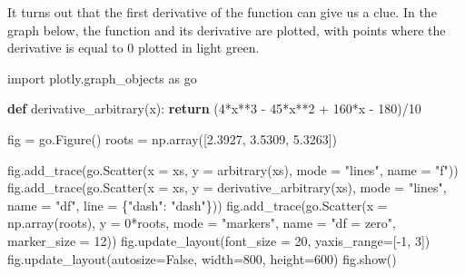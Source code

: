 \documentclass[
  letterpaper,
  DIV=11,
  numbers=noendperiod]{scrreprt}
\newenvironment{Shaded}{\begin{snugshade}}{\end{snugshade}}
\newcommand{\ControlFlowTok}[1]{\textcolor[rgb]{0.00,0.23,0.31}{\textbf{#1}}}
\newcommand{\DecValTok}[1]{\textcolor[rgb]{0.68,0.00,0.00}{#1}}
\newcommand{\FloatTok}[1]{\textcolor[rgb]{0.68,0.00,0.00}{#1}}
\newcommand{\ImportTok}[1]{\textcolor[rgb]{0.00,0.46,0.62}{#1}}
\newcommand{\KeywordTok}[1]{\textcolor[rgb]{0.00,0.23,0.31}{\textbf{#1}}}
\newcommand{\NormalTok}[1]{\textcolor[rgb]{0.00,0.23,0.31}{#1}}
\newcommand{\OperatorTok}[1]{\textcolor[rgb]{0.37,0.37,0.37}{#1}}
\newcommand{\StringTok}[1]{\textcolor[rgb]{0.13,0.47,0.30}{#1}}
\newcommand{\VariableTok}[1]{\textcolor[rgb]{0.07,0.07,0.07}{#1}}
\begin{document}
It turns out that the first derivative of the function can give us a
clue. In the graph below, the function and its derivative are plotted,
with points where the derivative is equal to 0 plotted in light green.

\begin{Shaded}
\begin{Highlighting}[]
\ImportTok{import}\NormalTok{ plotly.graph\_objects }\ImportTok{as}\NormalTok{ go}

\KeywordTok{def}\NormalTok{ derivative\_arbitrary(x):}
    \ControlFlowTok{return}\NormalTok{ (}\DecValTok{4}\OperatorTok{*}\NormalTok{x}\OperatorTok{**}\DecValTok{3} \OperatorTok{{-}} \DecValTok{45}\OperatorTok{*}\NormalTok{x}\OperatorTok{**}\DecValTok{2} \OperatorTok{+} \DecValTok{160}\OperatorTok{*}\NormalTok{x }\OperatorTok{{-}} \DecValTok{180}\NormalTok{)}\OperatorTok{/}\DecValTok{10}

\NormalTok{fig }\OperatorTok{=}\NormalTok{ go.Figure()}
\NormalTok{roots }\OperatorTok{=}\NormalTok{ np.array([}\FloatTok{2.3927}\NormalTok{, }\FloatTok{3.5309}\NormalTok{, }\FloatTok{5.3263}\NormalTok{])}

\NormalTok{fig.add\_trace(go.Scatter(x }\OperatorTok{=}\NormalTok{ xs, y }\OperatorTok{=}\NormalTok{ arbitrary(xs), }
\NormalTok{                         mode }\OperatorTok{=} \StringTok{"lines"}\NormalTok{, name }\OperatorTok{=} \StringTok{"f"}\NormalTok{))}
\NormalTok{fig.add\_trace(go.Scatter(x }\OperatorTok{=}\NormalTok{ xs, y }\OperatorTok{=}\NormalTok{ derivative\_arbitrary(xs), }
\NormalTok{                         mode }\OperatorTok{=} \StringTok{"lines"}\NormalTok{, name }\OperatorTok{=} \StringTok{"df"}\NormalTok{, line }\OperatorTok{=}\NormalTok{ \{}\StringTok{"dash"}\NormalTok{: }\StringTok{"dash"}\NormalTok{\}))}
\NormalTok{fig.add\_trace(go.Scatter(x }\OperatorTok{=}\NormalTok{ np.array(roots), y }\OperatorTok{=} \DecValTok{0}\OperatorTok{*}\NormalTok{roots, }
\NormalTok{                         mode }\OperatorTok{=} \StringTok{"markers"}\NormalTok{, name }\OperatorTok{=} \StringTok{"df = zero"}\NormalTok{, marker\_size }\OperatorTok{=} \DecValTok{12}\NormalTok{))}
\NormalTok{fig.update\_layout(font\_size }\OperatorTok{=} \DecValTok{20}\NormalTok{, yaxis\_range}\OperatorTok{=}\NormalTok{[}\OperatorTok{{-}}\DecValTok{1}\NormalTok{, }\DecValTok{3}\NormalTok{])}
\NormalTok{fig.update\_layout(autosize}\OperatorTok{=}\VariableTok{False}\NormalTok{, width}\OperatorTok{=}\DecValTok{800}\NormalTok{, height}\OperatorTok{=}\DecValTok{600}\NormalTok{)}
\NormalTok{fig.show()}
\end{Highlighting}
\end{Shaded}
\end{document}
